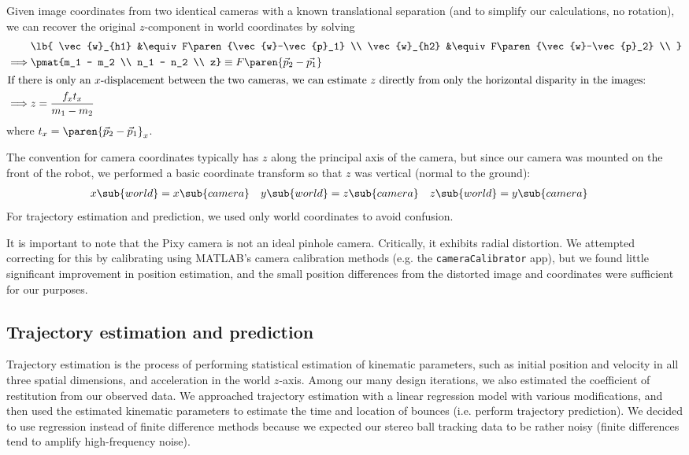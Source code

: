 \documentclass[letterpaper, 11pt]{article}
\renewcommand{\v}[1]{\vec{#1}}
\begin{document}
\begin{enumerate}[label=\textbf{\arabic*.}]
Given image coordinates from two identical cameras with a known translational separation (and to simplify our calculations, no rotation), we can recover the original $z$-component in world coordinates by solving
\begin{align*}
    &\lb{
        \v{w}_{h1} &\equiv F\paren{\v{w}-\v{p}_1} \\
        \v{w}_{h2} &\equiv F\paren{\v{w}-\v{p}_2} \\
    } \\
    \implies &\pmat{m_1 - m_2 \\ n_1 - n_2 \\ z} \equiv F\paren{\v{p}_2 - \v{p_1}} \\
    \intertext{If there is only an $x$-displacement between the two cameras, we can estimate $z$ directly from only the horizontal disparity in the images:}
    \implies &z = \frac{f_x t_x}{m_1 - m_2}
\end{align*}
where $t_x = \paren{\v{p}_{2} - \v{p}_{1}}_x$.

The convention for camera coordinates typically has $z$ along the principal axis of the camera, but since our camera was mounted on the front of the robot, we performed a basic coordinate transform so that $z$ was vertical (normal to the ground):
\begin{align*}
    x\sub{world} &= x\sub{camera} & y\sub{world} &= z\sub{camera} & z\sub{world} &= y\sub{camera}
\end{align*}
For trajectory estimation and prediction, we used only world coordinates to avoid confusion.

It is important to note that the Pixy camera is not an ideal pinhole camera. Critically, it exhibits radial distortion. We attempted correcting for this by calibrating using MATLAB's camera calibration methods (e.g. the \verb|cameraCalibrator| app), but we found little significant improvement in position estimation, and the small position differences from the distorted image and coordinates were sufficient for our purposes.

\subsection{Trajectory estimation and prediction}
\label{sec:trajectory}
Trajectory estimation is the process of performing statistical estimation of kinematic parameters, such as initial position and velocity in all three spatial dimensions, and acceleration in the world $z$-axis. Among our many design iterations, we also estimated the coefficient of restitution from our observed data. We approached trajectory estimation with a linear regression model with various modifications, and then used the estimated kinematic parameters to estimate the time and location of bounces (i.e. perform trajectory prediction). We decided to use regression instead of finite difference methods because we expected our stereo ball tracking data to be rather noisy (finite differences tend to amplify high-frequency noise).


\end{enumerate}
\end{document}
